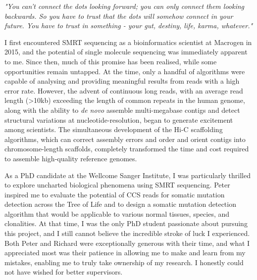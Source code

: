 
\begin{acknowledgements}      

\textit{"You can't connect the dots looking forward; you can only connect them looking backwards. So you have to trust that the dots will somehow connect in your future. You have to trust in something - your gut, destiny, life, karma, whatever."} 
\begin{flushright}  \end{flushright}

I first encountered SMRT sequencing as a bioinformatics scientist at Macrogen in 2015, and the potential of single molecule sequencing was immediately apparent to me. Since then, much of this promise has been realised, while some opportunities remain untapped. At the time, only a handful of algorithms were capable of analysing and providing meaningful results from reads with a high error rate. However, the advent of continuous long reads, with an average read length (>10kb) exceeding the length of common repeats in the human genome, along with the ability to \textit{de novo} assemble multi-megabase contigs and detect structural variations at nucleotide-resolution, began to generate excitement among scientists. The simultaneous development of the Hi-C scaffolding algorithms, which can correct assembly errors and order and orient contigs into chromosome-length scaffolds, completely transformed the time and cost required to assemble high-quality reference genomes.
 
As a PhD candidate at the Wellcome Sanger Institute, I was particularly thrilled to explore uncharted biological phenomena using SMRT sequencing. Peter inspired me to evaluate the potential of CCS reads for somatic mutation detection across the Tree of Life and to design a somatic mutation detection algorithm that would be applicable to various normal tissues, species, and clonalities. At that time, I was the only PhD student passionate about pursuing this project, and I still cannot believe the incredible stroke of luck I experienced. Both Peter and Richard were exceptionally generous with their time, and what I appreciated most was their patience in allowing me to make and learn from my mistakes, enabling me to truly take ownership of my research. I honestly could not have wished for better supervisors.

\end{acknowledgements}
